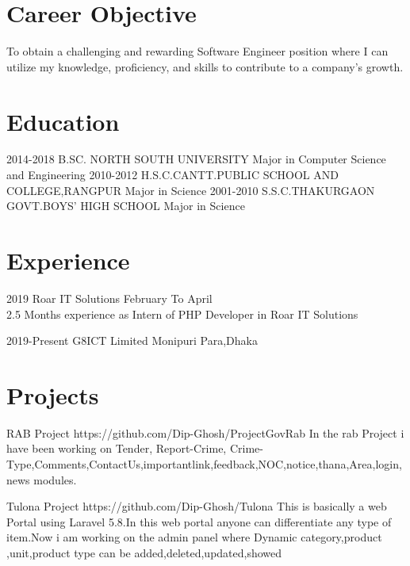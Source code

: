 \documentclass[]{cv-style}
\begin{document}
\section{Career Objective}
To obtain a challenging and rewarding Software Engineer position where I can utilize my knowledge, proficiency, and skills to contribute to a company's growth.
\section{Education}
\begin{entrylist}
  \entry
    {2014-2018} 
    {B.SC. NORTH SOUTH UNIVERSITY}
    {Major in Computer Science and Engineering}
    {}
  \entry
    {2010-2012}
    {H.S.C.CANTT.PUBLIC SCHOOL AND COLLEGE,RANGPUR}
    {Major in Science}
        {}
  \entry
    {2001-2010}
    {S.S.C.THAKURGAON GOVT.BOYS' HIGH SCHOOL}
    {Major in Science}
     {}


\end{entrylist}
\section{Experience}
\begin{entrylist}
\entry
  {2019}
  {Roar IT Solutions}
  {February To April}
  {\\
  2.5 Months experience as Intern of PHP Developer in Roar IT Solutions}
  
\entry
  {2019-Present}
  {G8ICT Limited}
  {Monipuri Para,Dhaka}
  {}

\end{entrylist}
\section{Projects}
\begin{entrylist}
\entry
{}
{RAB Project}
{{https://github.com/Dip-Ghosh/ProjectGovRab}}
{In the rab Project i have been working on Tender, Report-Crime, Crime-Type,Comments,ContactUs,importantlink,feedback,NOC,notice,thana,Area,login,news modules.}
\end{entrylist}
\begin{entrylist}
\entry
{}
{Tulona Project }
{{https://github.com/Dip-Ghosh/Tulona}}
{This is basically a web Portal using Laravel 5.8.In this web portal anyone can differentiate any type of item.Now i am working on the admin panel where Dynamic category,product ,unit,product type can be added,deleted,updated,showed}

\end{entrylist}
\end{document}
